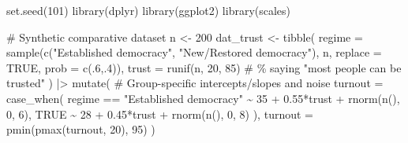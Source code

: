 \documentclass[
  letterpaper,
  DIV=11,
  numbers=noendperiod]{scrreprt}
\newenvironment{Shaded}{\begin{snugshade}}{\end{snugshade}}
\newcommand{\AttributeTok}[1]{\textcolor[rgb]{0.40,0.45,0.13}{#1}}
\newcommand{\CommentTok}[1]{\textcolor[rgb]{0.37,0.37,0.37}{#1}}
\newcommand{\ConstantTok}[1]{\textcolor[rgb]{0.56,0.35,0.01}{#1}}
\newcommand{\DecValTok}[1]{\textcolor[rgb]{0.68,0.00,0.00}{#1}}
\newcommand{\FloatTok}[1]{\textcolor[rgb]{0.68,0.00,0.00}{#1}}
\newcommand{\FunctionTok}[1]{\textcolor[rgb]{0.28,0.35,0.67}{#1}}
\newcommand{\NormalTok}[1]{\textcolor[rgb]{0.00,0.23,0.31}{#1}}
\newcommand{\OtherTok}[1]{\textcolor[rgb]{0.00,0.23,0.31}{#1}}
\newcommand{\SpecialCharTok}[1]{\textcolor[rgb]{0.37,0.37,0.37}{#1}}
\newcommand{\StringTok}[1]{\textcolor[rgb]{0.13,0.47,0.30}{#1}}
\begin{document}
\begin{Shaded}
\begin{Highlighting}[]
\FunctionTok{set.seed}\NormalTok{(}\DecValTok{101}\NormalTok{)}
\FunctionTok{library}\NormalTok{(dplyr)}
\FunctionTok{library}\NormalTok{(ggplot2)}
\FunctionTok{library}\NormalTok{(scales)}

\CommentTok{\# Synthetic comparative dataset}
\NormalTok{n }\OtherTok{\textless{}{-}} \DecValTok{200}
\NormalTok{dat\_trust }\OtherTok{\textless{}{-}} \FunctionTok{tibble}\NormalTok{(}
  \AttributeTok{regime =} \FunctionTok{sample}\NormalTok{(}\FunctionTok{c}\NormalTok{(}\StringTok{"Established democracy"}\NormalTok{, }\StringTok{"New/Restored democracy"}\NormalTok{), n, }\AttributeTok{replace =} \ConstantTok{TRUE}\NormalTok{, }\AttributeTok{prob =} \FunctionTok{c}\NormalTok{(.}\DecValTok{6}\NormalTok{,.}\DecValTok{4}\NormalTok{)),}
  \AttributeTok{trust  =} \FunctionTok{runif}\NormalTok{(n, }\DecValTok{20}\NormalTok{, }\DecValTok{85}\NormalTok{) }\CommentTok{\# \% saying "most people can be trusted"}
\NormalTok{) }\SpecialCharTok{|\textgreater{}}
  \FunctionTok{mutate}\NormalTok{(}
    \CommentTok{\# Group{-}specific intercepts/slopes and noise}
    \AttributeTok{turnout =} \FunctionTok{case\_when}\NormalTok{(}
\NormalTok{      regime }\SpecialCharTok{==} \StringTok{"Established democracy"} \SpecialCharTok{\textasciitilde{}} \DecValTok{35} \SpecialCharTok{+} \FloatTok{0.55}\SpecialCharTok{*}\NormalTok{trust }\SpecialCharTok{+} \FunctionTok{rnorm}\NormalTok{(}\FunctionTok{n}\NormalTok{(), }\DecValTok{0}\NormalTok{, }\DecValTok{6}\NormalTok{),}
      \ConstantTok{TRUE}                              \SpecialCharTok{\textasciitilde{}} \DecValTok{28} \SpecialCharTok{+} \FloatTok{0.45}\SpecialCharTok{*}\NormalTok{trust }\SpecialCharTok{+} \FunctionTok{rnorm}\NormalTok{(}\FunctionTok{n}\NormalTok{(), }\DecValTok{0}\NormalTok{, }\DecValTok{8}\NormalTok{)}
\NormalTok{    ),}
    \AttributeTok{turnout =} \FunctionTok{pmin}\NormalTok{(}\FunctionTok{pmax}\NormalTok{(turnout, }\DecValTok{20}\NormalTok{), }\DecValTok{95}\NormalTok{)}
\NormalTok{  )}


\end{Highlighting}
\end{Shaded}
\end{document}
